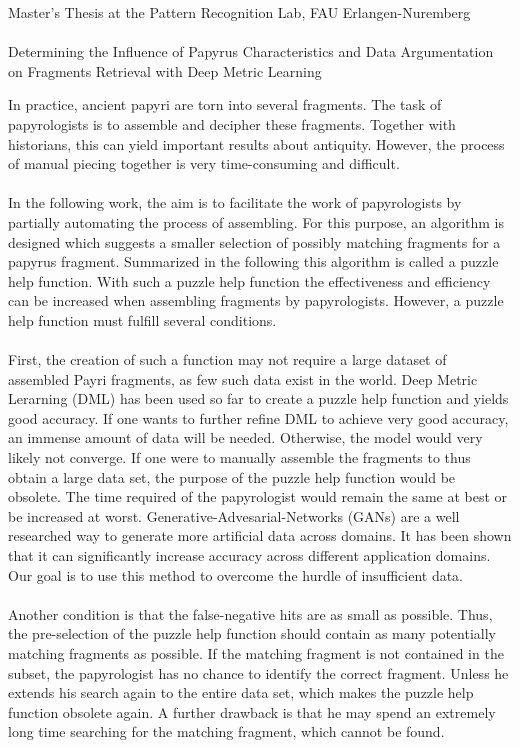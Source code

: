 \documentclass[12pt,a4paper]{article}
\begin{document}
\begin{center}
	Master's Thesis at the Pattern Recognition Lab, FAU Erlangen-Nuremberg \hfill \\[5mm]
																				
	\mbox{}\\
	{\Large Determining the Influence of Papyrus Characteristics and Data Argumentation on Fragments Retrieval with Deep Metric Learning}
			
\end{center}


In practice, ancient papyri are torn into several fragments. The task of papyrologists is to assemble and decipher these fragments. Together with historians, this can yield important results about antiquity. However, the process of manual piecing together is very time-consuming and difficult.
\\\\
In the following work, the aim is to facilitate the work of papyrologists by partially automating the process of assembling. For this purpose, an algorithm is designed which suggests a smaller selection of possibly matching fragments for a papyrus fragment. Summarized in the following this algorithm is called a puzzle help function. With such a puzzle help function the effectiveness and efficiency can be increased when assembling fragments by papyrologists. However, a puzzle help function must fulfill several conditions.
\\\\
First, the creation of such a function may not require a large dataset of assembled Payri fragments, as few such data exist in the world. Deep Metric Lerarning (DML) has been used so far to create a puzzle help function and yields good accuracy. If one wants to further refine DML to achieve very good accuracy, an immense amount of data will be needed. Otherwise, the model would very likely not converge. If one were to manually assemble the fragments to thus obtain a large data set, the purpose of the puzzle help function would be obsolete. The time required of the papyrologist would remain the same at best or be increased at worst. Generative-Advesarial-Networks (GANs) are a well researched way to generate more artificial data across domains. It has been shown that it can significantly increase accuracy across different application domains. Our goal is to use this method to overcome the hurdle of insufficient data.
\\\\
Another condition is that the false-negative hits are as small as possible. Thus, the pre-selection of the puzzle help function should contain as many potentially matching fragments as possible. If the matching fragment is not contained in the subset, the papyrologist has no chance to identify the correct fragment. Unless he extends his search again to the entire data set, which makes the puzzle help function obsolete again. A further drawback is that he may spend an extremely long time searching for the matching fragment, which cannot be found. 
\end{document}
